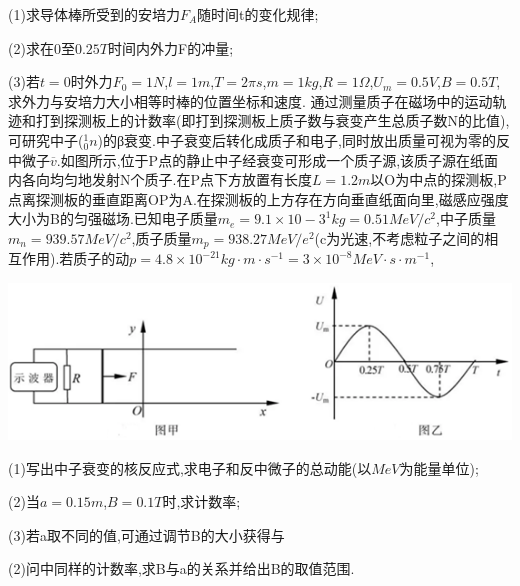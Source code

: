 (1)求导体棒所受到的安培力$F_A$随时间t的变化规律;

(2)求在0至$0.25T$时间内外力F的冲量;

(3)若$t=0$时外力$F_0=1N$,$l=1m$,$T=2πs$,$m=1kg$,$R=1Ω$,$U_m=0.5V$,$B=0.5T$,求外力与安培力大小相等时棒的位置坐标和速度.
\question[6] 通过测量质子在磁场中的运动轨迹和打到探测板上的计数率(即打到探测板上质子数与衰变产生总质子数N的比值),可研究中子($_{0}^{1}n$)的β衰变.中子衰变后转化成质子和电子,同时放出质量可视为零的反中微子$\overline{v}.$如图所示,位于P点的静止中子经衰变可形成一个质子源,该质子源在纸面内各向均匀地发射N个质子.在P点下方放置有长度$L=1.2m$以O为中点的探测板,P点离探测板的垂直距离OP为A.在探测板的上方存在方向垂直纸面向里,磁感应强度大小为B的匀强磁场.已知电子质量$m_e=9.1×10-3^1kg=0.51MeV/c^2$,中子质量$m_n=939.57MeV/c^2$,质子质量$m_p=938.27MeV/e^2$(c为光速,不考虑粒子之间的相互作用).若质子的动$p=4.8\times 10^{-21}kg\cdot m\cdot s^{-1}=3\times 10^{-8}MeV\cdot s\cdot m^{-1}$,\begin{center}\includegraphics[]{img/image19.png}\end{center}

(1)写出中子衰变的核反应式,求电子和反中微子的总动能(以$MeV$为能量单位);

(2)当$a=0.15m$,$B=0.1T$时,求计数率;

(3)若a取不同的值,可通过调节B的大小获得与

(2)问中同样的计数率,求B与a的关系并给出B的取值范围.
